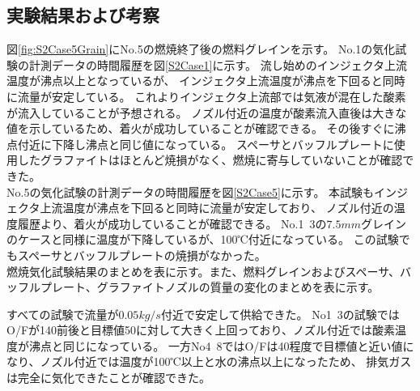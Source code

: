 \subsection{実験結果および考察}
図\ref{fig:S2Case5Grain}にNo.5の燃焼終了後の燃料グレインを示す。
No.1の気化試験の計測データの時間履歴を図\ref{S2Case1}に示す。
流し始めのインジェクタ上流温度が沸点以上となっているが、
インジェクタ上流温度が沸点を下回ると同時に流量が安定している。
これよりインジェクタ上流部では気液が混在した酸素が流入していることが予想される。
ノズル付近の温度が酸素流入直後は大きな値を示しているため、着火が成功していることが確認できる。
その後すぐに沸点付近に下降し沸点と同じ値になっている。
スペーサとバッフルプレートに使用したグラファイトはほとんど焼損がなく、燃焼に寄与していないことが確認できた。
\\
No.5の気化試験の計測データの時間履歴を図\ref{S2Case5}に示す。
本試験もインジェクタ上流温度が沸点を下回ると同時に流量が安定しており、
ノズル付近の温度履歴より、着火が成功していることが確認できる。
No.1~3の$7.5mm$グレインのケースと同様に温度が下降しているが、100℃付近になっている。
この試験でもスペーサとバッフルプレートの焼損がなかった。
\\
燃焼気化試験結果のまとめを表に示す。また、燃料グレインおよびスペーサ、バッフルプレート、グラファイトノズルの質量の変化のまとめを表に示す。

すべての試験で流量が$0.05kg/s$付近で安定して供給できた。
No1~3の試験ではO/Fが140前後と目標値50に対して大きく上回っており、ノズル付近では酸素温度が沸点と同じになっている。
一方No4~8ではO/Fは40程度で目標値と近い値になり、ノズル付近では温度が100℃以上と水の沸点以上になったため、
排気ガスは完全に気化できたことが確認できた。
\\

